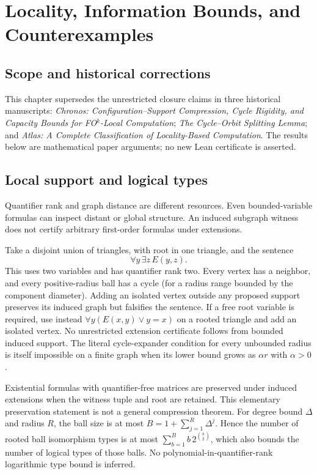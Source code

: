 \chapter{Locality, Information Bounds, and Counterexamples}
\label{chap:locality-corrections}
\section{Scope and historical corrections}
This chapter supersedes the unrestricted closure claims in three historical manuscripts: \emph{Chronos: Configuration--Support Compression, Cycle Rigidity, and Capacity Bounds for FO$^k$-Local Computation}; \emph{The Cycle--Orbit Splitting Lemma}; and \emph{Atlas: A Complete Classification of Locality-Based Computation}. The results below are mathematical paper arguments; no new Lean certificate is asserted.

\section{Local support and logical types}
Quantifier rank and graph distance are different resources. Even bounded-variable formulas can inspect distant or global structure. An induced subgraph witness does not certify arbitrary first-order formulas under extensions.
\begin{example}
Take a disjoint union of triangles, with root in one triangle, and the sentence
\[
\forall y\,\exists z\,E(y,z).
\]
This uses two variables and has quantifier rank two. Every vertex has a neighbor, and every positive-radius ball has a cycle (for a radius range bounded by the component diameter). Adding an isolated vertex outside any proposed support preserves its induced graph but falsifies the sentence. If a free root variable is required, use instead $\forall y(E(x,y)\lor y=x)$ on a rooted triangle and add an isolated vertex. No unrestricted extension certificate follows from bounded induced support. The literal cycle-expander condition for every unbounded radius is itself impossible on a finite graph when its lower bound grows as $\alpha r$ with $\alpha>0$.
\end{example}
Existential formulas with quantifier-free matrices are preserved under induced extensions when the witness tuple and root are retained. This elementary preservation statement is not a general compression theorem. For degree bound $\Delta$ and radius $R$, the ball size is at most $B=1+\sum_{j=1}^R\Delta^j$. Hence the number of rooted ball isomorphism types is at most $\sum_{b=1}^B b\,2^{\binom b2}$, which also bounds the number of logical types of those balls. No polynomial-in-quantifier-rank logarithmic type bound is inferred.

